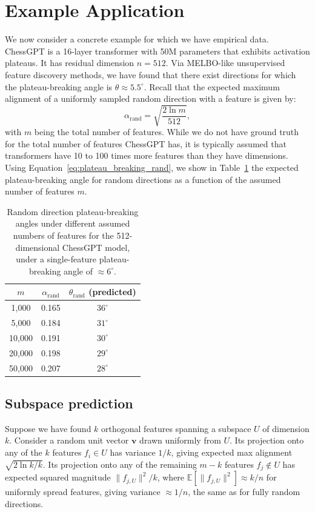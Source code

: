 \documentclass[11pt]{article}
\begin{document}
\section{Example Application}
We now consider a concrete example for which we have empirical data.
ChessGPT is a 16-layer transformer with 50M parameters that exhibits activation plateaus.
It has residual dimension $n=512$.
Via MELBO-like unsupervised feature discovery methods, we have found that there exist directions for which the plateau-breaking angle is $\theta \approx 5.5^\circ$.
Recall that the expected maximum alignment of a uniformly sampled random direction with a feature is given by:
\begin{equation}
\alpha_{\text{rand}} = \sqrt{\frac{2 \ln m}{512}},
\end{equation}
with $m$ being the total number of features.
While we do not have ground truth for the total number of features ChessGPT has, it is typically assumed that transformers have 10 to 100 times more features than they have dimensions.
Using Equation~\eqref{eq:plateau_breaking_rand}, we show in Table~\ref{tab:angles_rand_chess} the expected plateau-breaking angle for random directions as a function of the assumed number of features $m$.
\begin{table}[!ht]
\centering
\begin{tabular}{@{}ccc@{}}
    \toprule
    $m$ & $\alpha_{\mathrm{rand}}$ & $\theta_{\mathrm{rand}}$ (predicted) \\
    \midrule
    1{,}000   & 0.165 & $36^\circ$ \\
    5{,}000   & 0.184 & $31^\circ$ \\
    10{,}000  & 0.191 & $30^\circ$ \\
    20{,}000  & 0.198 & $29^\circ$ \\
    50{,}000  & 0.207 & $28^\circ$ \\
    \bottomrule
\end{tabular}
\caption{Random direction plateau-breaking angles under different assumed numbers of features for the 512-dimensional ChessGPT model, under a single-feature plateau-breaking angle of $\approx 6^\circ$.}
\label{tab:angles_rand_chess}
\end{table}

\subsection{Subspace prediction}
Suppose we have found $k$ orthogonal features spanning a subspace $U$ of dimension $k$.
Consider a random unit vector $\mathbf{v}$ drawn uniformly from $U$.
Its projection onto any of the $k$ features $f_i \in U$ has variance $1/k$, giving expected max alignment $\sqrt{2 \ln k / k}$.
Its projection onto any of the remaining $m - k$ features $f_j \notin U$ has expected squared magnitude $\|f_{j,U}\|^2 / k$, where $\mathbb{E}[\|f_{j,U}\|^2] \approx k/n$ for uniformly spread features, giving variance $\approx 1/n$, the same as for fully random directions.
\end{document}
